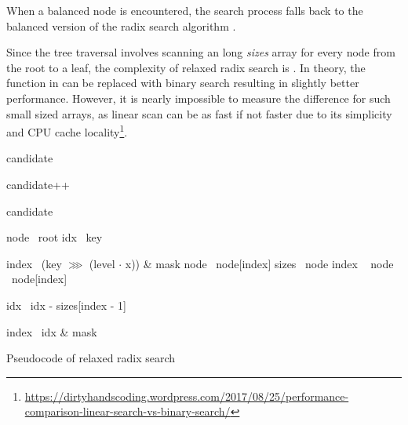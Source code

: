 When a balanced node is encountered, the search process falls back to the balanced version of the radix search algorithm . 

Since the tree traversal involves scanning an \m{} long \emph{sizes} array for every node from the root to a leaf, the complexity of relaxed radix search is . In theory, the  function in  can be replaced with binary search resulting in slightly better  performance. However, it is nearly impossible to measure the difference for such small sized arrays, as linear scan can be as fast if not faster due to its simplicity and CPU cache locality\footnote{\url{https://dirtyhandscoding.wordpress.com/2017/08/25/performance-comparison-linear-search-vs-binary-search/}}.

\begin{listing}[!ht]

    \begin{algorithmic}[1]
            \State candidate 

                \State candidate++
            \EndIf

            \State \Return candidate
        \EndFunction

        \State

            \State node \la\ root
            \State idx \la\ key

                    \State index \la\ (key $\ggg$ (level $\cdot$ x)) \& mask
                    \State node \la\ node[index]
                \Else
                    \State sizes \la\ node
                    \State index \la\ 
                    \State node \la\ node[index]

                        \State idx \la\ idx - sizes[index - 1]
                    \EndIf
                \EndIf
            \EndFor

            \State index \la\ idx \& mask
            \State {}
        \EndFunction
    \end{algorithmic}

    \caption{Pseudocode of relaxed radix search}
    \label{lst:rrb-tree-relaxed-radix-search}
\end{listing}


